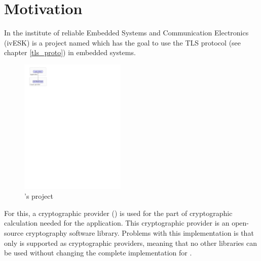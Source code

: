 ﻿\chapter{Motivation}
\label{motiv}
In the institute of reliable Embedded Systems and Communication Electronics
(ivESK) is a project named \embtls which has the goal to use the TLS protocol
(see chapter \ref{tls_proto}) in embedded systems.

\begin{figure}[!ht]
\centering
\includegraphics[trim=0cm 23.25cm 15cm 0cm,
height=6.5cm]{figures/intro_embtls.pdf}
\caption{\embtls's project}
\label{fig:motiv_embtls}

\end{figure}
For this, a cryptographic provider (\tomcrypt) is used for the part of
cryptographic calculation needed for the application.
This cryptographic provider is an open-source cryptography software
library.
Problems with this implementation is that only \tomcrypt is
supported as cryptographic providers, meaning that no other libraries can be used
without changing the complete implementation for \embtls.


